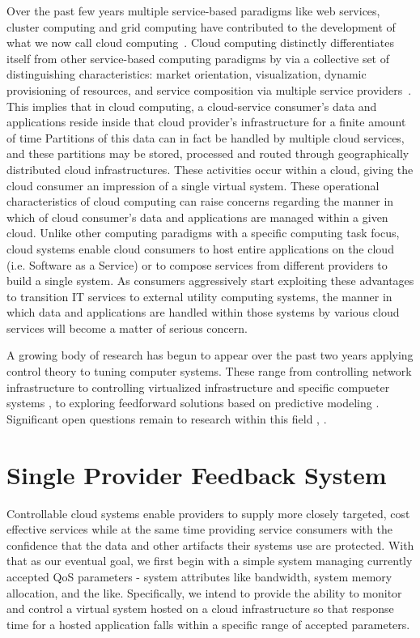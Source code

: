 \documentclass[times, 10pt,twocolumn]{article}
\begin{document}
Over the past few years multiple service-based paradigms like web services, cluster computing and grid computing have contributed to the development of what we now call cloud computing~\cite{Bu:09}. Cloud computing distinctly differentiates itself from other service-based computing paradigms by via a collective set of distinguishing characteristics:  market orientation, visualization, dynamic provisioning of resources, and service composition via multiple service providers~\cite{BuYeVeBrBr:09}. This implies that in cloud computing, a cloud-service consumer's data and applications reside inside that cloud provider's infrastructure for a finite amount of time  Partitions of this data can in fact be handled by multiple cloud services, and these partitions may be stored, processed and routed through geographically distributed cloud infrastructures. These activities occur within a cloud, giving the cloud consumer an impression of a single virtual system.  These operational characteristics of cloud computing can raise concerns regarding the manner in which of cloud consumer's data and applications are managed within a given cloud. Unlike other computing paradigms with a specific computing task focus, cloud systems enable cloud consumers to host entire applications on the cloud (i.e. Software as a Service) or to compose services from different providers to build a single system. As consumers aggressively start exploiting these advantages to transition IT services to external utility computing systems, the manner in which data and applications are handled within those systems by various cloud services will become a matter of serious concern.

A growing body of research has begun to appear over the past two years applying control theory to tuning computer systems.  These range from controlling network infrastructure \cite{ctrl:ariba-GL:2009} to controlling virtualized infrastructure and specific compueter systems \cite{ctrl:wang-cgswrzh:2009}, \cite{ctrl:kjaer-kr:2009} to exploring feedforward solutions based on predictive modeling \cite{ctrl:abdelwahed-bsk:2009}.  Significant open questions remain to research within this field \cite{ctrl:Zhu:2009:CTB:1496909.1496922}, \cite{ctrl:hellerstein-sw:2009}.

\section{Single Provider Feedback System}\label{sec:single}
Controllable cloud systems enable providers to supply more closely targeted, cost effective services while at the same time providing service consumers with the confidence that the data and other artifacts their systems use are protected.  With that as our eventual goal, we first begin with a simple system managing currently accepted QoS parameters - system attributes like bandwidth, system memory allocation, and the like.  Specifically, we intend to provide the ability to monitor and control a virtual system hosted on a cloud infrastructure so that response time for a hosted application falls within a specific range of accepted parameters.
\end{document}
